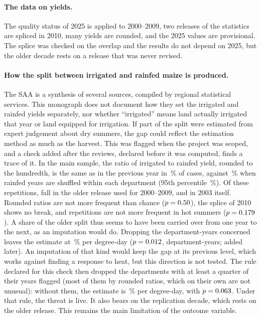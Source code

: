 \paragraph{The data on yields.} The quality status of 2025 is applied to 2000--2009, two releases of the statistics are spliced in 2010, many yields are rounded, and the 2025 values are provisional. The splice was checked on the overlap and the results do not depend on 2025, but the older decade rests on a release that was never revised.

\paragraph{How the split between irrigated and rainfed maize is produced.} The SAA is a synthesis of several sources, compiled by regional statistical services. This monograph does not document how they set the irrigated and rainfed yields separately, nor whether ``irrigated'' means land actually irrigated that year or land equipped for irrigation. If part of the split were estimated from expert judgement about dry summers, the gap could reflect the estimation method as much as the harvest. This was flagged when the project was scoped, and a check added after the reviews, declared before it was computed, finds a trace of it. In the main sample, the ratio of irrigated to rainfed yield, rounded to the hundredth, is the same as in the previous year in \SaaRepPct\,\% of cases, against \SaaRepRefPct\,\% when rainfed years are shuffled within each department (95th percentile \SaaRepPnf\,\%). Of these \SaaRepTot{} repetitions, \SaaRepOld{} fall in the older release used for 2000--2009, and \SaaRepTwoThousandThree{} in 2003 itself. Rounded ratios are not more frequent than chance ($p = 0.50$), the splice of 2010 shows no break, and repetitions are not more frequent in hot summers ($p = 0.179$). A share of the older split thus seems to have been carried over from one year to the next, as an imputation would do. Dropping the \SaaRepTot{} department-years concerned leaves the estimate at \NoRepeatPct\,\% per degree-day ($p = 0.012$, \NoRepeatN{} department-years; added later). An imputation of that kind would keep the gap at its previous level, which works against finding a response to heat, but this direction is not tested. The rule declared for this check then dropped the \SaaSixDeps{} departments with at least a quarter of their years flagged (most of them by rounded ratios, which on their own are not unusual): without them, the estimate is \SaaSixPct\,\% per degree-day, with $p = 0.063$. Under that rule, the threat is live. It also bears on the replication decade, which rests on the older release. This remains the main limitation of the outcome variable.

